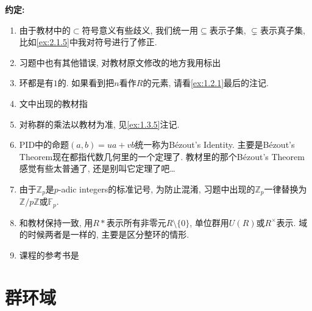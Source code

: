 \textbf{约定:}
\begin{enumerate}
    \item 由于教材中的$\subset$符号意义有些歧义, 我们统一用$\subseteq$表示子集, $\subsetneq$表示真子集, 比如\ref{ex:2.1.5}中我对符号进行了修正.
    \item 习题中也有其他错误, 对教材原文修改的地方我用标出
    \item 环都是有$1$的. 如果看到把$n$看作$R$的元素, 请看\ref{ex:1.2.1}最后的注记.
    \item 文中出现的教材指\cite{2022抽象代数}
    \item 对称群的乘法以教材为准, 见\ref{ex:1.3.5}注记.
    \item PID中的命题$(a, b) = ua + vb$统一称为Bézout's Identity. 主要是Bézout's Theorem现在都指代数几何里的一个定理了. 教材里的那个Bézout's Theorem感觉有些太普通了, 还是别叫它定理了吧\dots
    \item 由于$\mathbb{Z}_p$是$p$-adic integers的标准记号, 为防止混淆, 习题中出现的$\mathbb{Z}_p$一律替换为$\mathbb{Z}/p\mathbb{Z}$或$\mathbb{F}_p$.
    \item 和教材保持一致, 用$R*$表示所有非零元$R \setminus \{0\}$, 单位群用$U(R)$或$R^\times$表示. 域的时候两者是一样的, 主要是区分整环的情形.
    \item 课程的参考书是\cite{lang2012algebra}
\end{enumerate}

\section{群环域}



